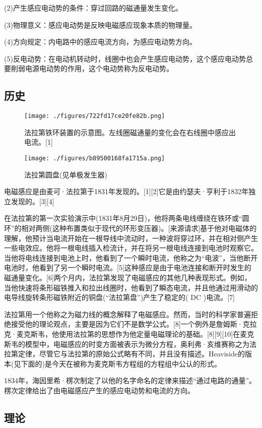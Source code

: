 (2)产生感应电动势的条件：穿过回路的磁通量发生变化。

(3)物理意义：感应电动势是反映电磁感应现象本质的物理量。

(4)方向规定：内电路中的感应电流方向，为感应电动势方向。

(5)反电动势：在电动机转动时，线圈中也会产生感应电动势，这个感应电动势总要削弱电源电动势的作用，这个电动势称为反电动势。
\subsection{历史}
\begin{figure}[ht]
\centering
\texttt{[image: ./figures/722fd17ce20fe82b.png]}
\caption{法拉第铁环装置的示意图。左线圈磁通量的变化会在右线圈中感应出电流。[1]} \label{fig_DCGY_3}
\end{figure}

\begin{figure}[ht]
\centering
\texttt{[image: ./figures/b89500168fa1715a.png]}
\caption{法拉第圆盘(见单极发生器)} \label{fig_DCGY_4}
\end{figure}
电磁感应是由麦可·法拉第于1831年发现的。[1][2]它是由约瑟夫·亨利于1832年独立发现的。[3][4]

在法拉第的第一次实验演示中(1831年8月29日)，他将两条电线缠绕在铁环或“圆环”的相对两侧(这种布置类似于现代的环形变压器)。[来源请求]基于他对电磁体的理解，他预计当电流开始在一根导线中流动时，一种波将穿过环，并在相对侧产生一些电效应。他将一根电线插入检流计，并在将另一根电线连接到电池时观察它。当他将电线连接到电池上时，他看到了一个瞬时电流，他称之为“电波”，当他断开电池时，他看到了另一个瞬时电流。[5]这种感应是由于电池连接和断开时发生的磁通量变化。[6]两个月内，法拉第发现了电磁感应的其他几种表现形式。例如，当他快速将条形磁铁推入和拉出线圈时，他看到了瞬态电流，并且他通过用滑动的电导线旋转条形磁铁附近的铜盘(“法拉第盘”)产生了稳定的( DC )电流。[7]

法拉第用一个他称之为磁力线的概念解释了电磁感应。然而，当时的科学家普遍拒绝接受他的理论观点，主要是因为它们不是数学公式。[8]一个例外是詹姆斯·克拉克·麦克斯韦，他使用法拉第的思想作为他定量电磁理论的基础。[8][9][10]在麦克斯韦的模型中，电磁感应的时变方面被表示为微分方程，奥利弗·亥维赛称之为法拉第定律，尽管它与法拉第的原始公式略有不同，并且没有描述。Heaviside的版本(见下面的)是今天在被称为麦克斯韦方程组的方程组中公认的形式。

1834年，海因里希·楞次制定了以他的名字命名的定律来描述“通过电路的通量”。楞次定律给出了由电磁感应产生的感应电动势和电流的方向。
\subsection{理论}
